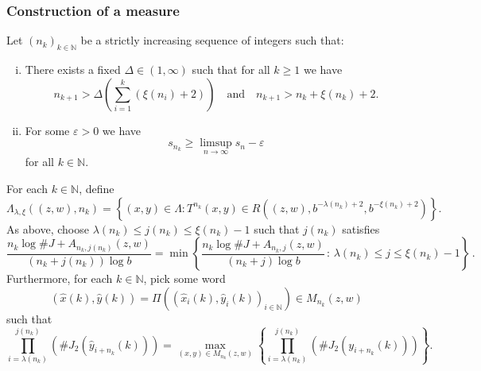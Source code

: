 \documentclass[12pt]{article}
\theoremstyle{remark}
\numberwithin{equation}{section}
\renewcommand{\Bbb}[1]{\mathbb{#1}}
\newcommand{\N}{{\Bbb N}}         %
\newcommand{\0}{\mathbf{0}}
\begin{document}
 \subsubsection{Construction of a measure}
 Let $(n_{k})_{k \in \N}$ be a strictly increasing sequence of integers such that:
 \begin{enumerate}[(i)]
     \item There exists a fixed $\Delta \in (1, \infty)$ \label{Delta def} such that for all $k \geq 1$ we have
 \begin{equation*}
     n_{k+1}> \Delta\left(\sum_{i=1}^{k}(\xi(n_{i})+2)\right) \quad \text{and} \quad n_{k+1}>n_{k}+\xi(n_{k})+2.
 \end{equation*}
 \item {For some $\varepsilon>0$ we have
 \begin{equation*} 
 s_{n_{k}} \geq \limsup_{n \to \infty} s_{n} - \varepsilon 
 \end{equation*}
for all $k \in \N$.}
 \end{enumerate}
For each $k \in \N$, define 
 \begin{equation*}
     \Lambda_{\lambda,\xi}((z,w),n_{k})=\left\{ (x,y) \in \Lambda : T^{n_{k}}(x,y) \in R\left((z,w),b^{-\lambda(n_k)+2}, b^{-\xi(n_{k})+2} \right) \right\}.
 \end{equation*}
As above, choose $\lambda(n_{k})\leq j(n_{k}) \leq \xi(n_{k})-1$ such that $j(n_k)$ satisfies
 \begin{equation*}
 \frac{n_{k}\log\#J+A_{n_{k},j(n_k)}(z,w)}{(n_{k}+j(n_k))\log b}=\min\left\{ \frac{n_{k}\log\#J+A_{n_{k},j}(z,w)}{(n_{k}+j)\log b} \, : \, \lambda(n_{k}) \leq j \leq \xi(n_{k})-1 \right\}\, .
 \end{equation*}
Furthermore, for each $k \in \N$, pick some word 
\[(\hat{x}(k),\hat{y}(k))=\Pi((\hat{x}_{i}(k), \hat{y}_{i}(k))_{i \in \N}) \in M_{n_{k}}(z,w)\] 
such that
\begin{equation*}
\prod_{i=\lambda(n_{k})}^{j(n_k)} (\#J_{2}(\hat{y}_{i+n_{k}}(k)))= \max_{(x,y) \in M_{n_{k}}(z,w)} \left\{ \prod_{i=\lambda(n_{k})}^{j(n_k)} (\#J_{2}(y_{i+n_{k}}(k))) \right\}.
\end{equation*}
\end{document}
